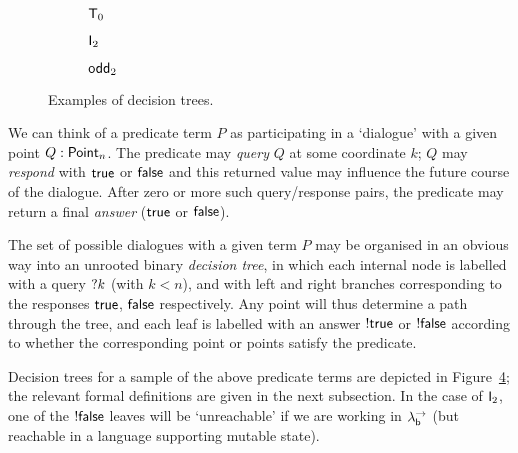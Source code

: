 \documentclass[12pt,phd,lfcs,twoside,openright,logo,leftchapter,normalheadings]{infthesis}
\theoremstyle{plain}
\theoremstyle{definition}
\begin{document}
\begin{figure}
  \centering
  \begin{subfigure}{0.1\textwidth}
    \begin{center}
    \scalebox{1.3}{\TTZeroModel}
    \vspace*{13.5ex}
    \end{center}
    \caption{$\mathsf{T}_0$}
    \label{fig:tt0-tree}
  \end{subfigure}
  \begin{subfigure}{0.3\textwidth}
    \begin{center}
    \scalebox{1.3}{\ShortConjModel}
    \end{center}
    \caption{$\mathsf{I}_2$}
    \label{fig:div1-tree}
  \end{subfigure}
  \begin{subfigure}{0.4\textwidth}
    \begin{center}
    \scalebox{1.3}{\XORTwoModel}
    \end{center}
    \caption{$\mathsf{odd}_2$}
    \label{fig:xor2-tree}
  \end{subfigure}
  \caption{Examples of decision trees.}
  \label{fig:example-models}
\end{figure}

We can think of a predicate term $P$ as participating in a `dialogue'
with a given point $Q : \mathsf{Point}_n$.
The predicate may \emph{query} $Q$ at some coordinate $k$;
$Q$ may \emph{respond} with $\mathsf{true}$ or $\mathsf{false}$ and this returned value
may influence the future course of the dialogue.
After zero or more such query/response pairs, the predicate may return a
final \emph{answer} ($\mathsf{true}$ or $\mathsf{false}$).

The set of possible dialogues with a given term $P$ may be organised
in an obvious way into an unrooted binary \emph{decision tree}, in
which each internal node is labelled with a query $\mathord{?} k$ (with
$k<n$), and with left and right branches corresponding to the
responses $\mathsf{true}$, $\mathsf{false}$ respectively.  Any point will thus
determine a path through the tree, and each leaf is labelled with an
answer $\mathord{!} \mathsf{true}$ or $\mathord{!} \mathsf{false}$ according to whether the
corresponding point or points satisfy the predicate.

Decision trees for a sample of the above predicate terms are depicted
in Figure~\ref{fig:example-models}; the relevant formal definitions
are given in the next subsection.  In the case of $\mathsf{I}_2$, one of
the $\mathord{!} \mathsf{false}$ leaves will be `unreachable' if we are working in
$\lambda^\rightarrow_{\mathsf{b}}$ (but reachable in a language supporting mutable state).
\end{document}

